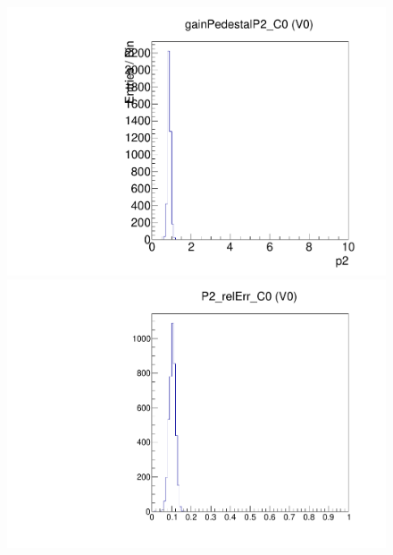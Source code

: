 \begin{figure}[!Hp]
\centering
\begin{minipage}{0.45\textwidth}
  \includegraphics[width=1.0\textwidth]{figures/gainped_gainPedestalP2.pdf}
  \caption{}
  \label{fig:gainped_gainPedestalP2}
\end{minipage}
\hspace{0.3cm}
\begin{minipage}{0.45\textwidth}
  \includegraphics[width=1.0\textwidth]{figures/gainped_P2_relErr.pdf}
  \caption{}
  \label{fig:gainped_P2_relErr}
\end{minipage}
\end{figure}


